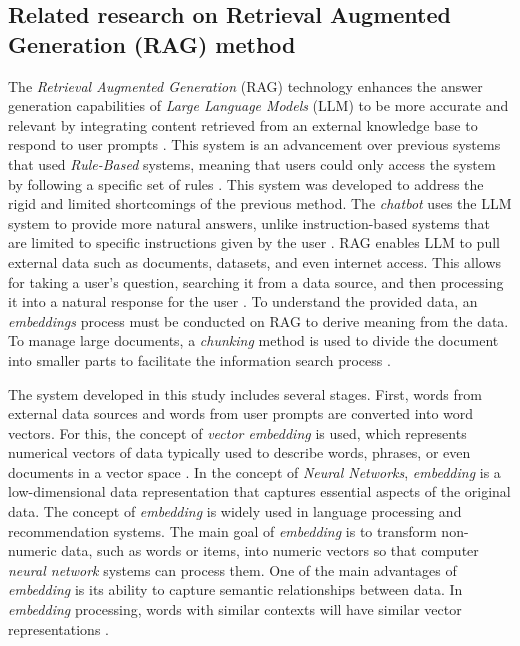 \subsection{Related research on Retrieval Augmented Generation (RAG) method}
The \emph{Retrieval Augmented Generation} (RAG) technology enhances the answer generation capabilities of \emph{Large Language Models} (LLM) to be more accurate and relevant by integrating content retrieved from an external knowledge base to respond to user prompts \cite{xu2024nanjing}. This system is an advancement over previous systems that used \emph{Rule-Based} systems, meaning that users could only access the system by following a specific set of rules \cite{9501523}. This system was developed to address the rigid and limited shortcomings of the previous method. The \emph{chatbot} uses the LLM system to provide more natural answers, unlike instruction-based systems that are limited to specific instructions given by the user \cite{sarrouti2020sembionlqa}. RAG enables LLM to pull external data such as documents, datasets, and even internet access. This allows for taking a user's question, searching it from a data source, and then processing it into a natural response for the user \cite{tian2023intelligent}. To understand the provided data, an \emph{embeddings} process must be conducted on RAG to derive meaning from the data. To manage large documents, a \emph{chunking} method is used to divide the document into smaller parts to facilitate the information search process \cite{10448015}.


The system developed in this study includes several stages. First, words from external data sources and words from user prompts are converted into word vectors. For this, the concept of \emph{vector embedding} is used, which represents numerical vectors of data typically used to describe words, phrases, or even documents in a vector space \cite{kmetty2021presence}. In the concept of \emph{Neural Networks}, \emph{embedding} is a low-dimensional data representation that captures essential aspects of the original data. The concept of \emph{embedding} is widely used in language processing and recommendation systems. The main goal of \emph{embedding} is to transform non-numeric data, such as words or items, into numeric vectors so that computer \emph{neural network} systems can process them. One of the main advantages of \emph{embedding} is its ability to capture semantic relationships between data. In \emph{embedding} processing, words with similar contexts will have similar vector representations \cite{luo2018concept}.


